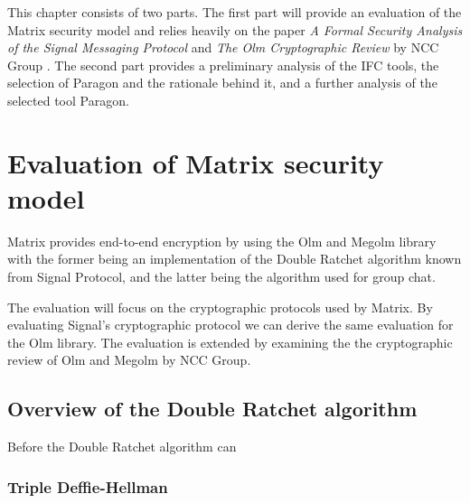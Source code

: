 This chapter consists of two parts. The first part will provide an evaluation of the Matrix security model and relies heavily on the paper \emph{A Formal Security Analysis of the Signal Messaging Protocol} \cite{Signal} and \emph{The Olm Cryptographic Review} by NCC Group \cite{ncc}. The second part provides a preliminary analysis of the IFC tools, the selection of Paragon and the rationale behind it, and a further analysis of the selected tool Paragon.


\section{Evaluation of Matrix security model}

Matrix provides end-to-end encryption by using the Olm and Megolm library with the former being an implementation of the Double Ratchet algorithm known from Signal Protocol, and the latter being the algorithm used for group chat. 

The evaluation will focus on the cryptographic protocols used by Matrix. By evaluating Signal's cryptographic protocol we can derive the same evaluation for the Olm library. The evaluation is extended by examining the the cryptographic review of Olm and Megolm by NCC Group. 

\subsection{Overview of the Double Ratchet algorithm}

Before the Double Ratchet algorithm can 

\subsubsection{Triple Deffie-Hellman}


